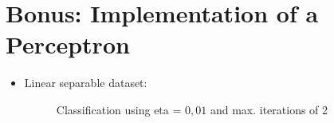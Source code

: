 \documentclass{article}
\begin{document}
\section{Bonus: Implementation of a Perceptron}

\begin{itemize}
	\item Linear separable dataset:
	
	\begin{figure}[!ht]
	\caption{Classification using eta = $0,01$ and max. iterations of 2}
	\label{perceptron1}
	\end{figure}
	

\end{itemize}
\end{document}
